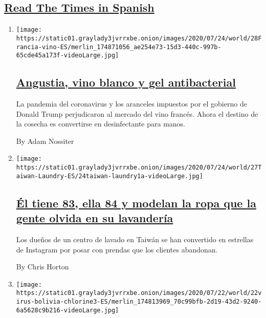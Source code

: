 \hypertarget{read-the-times-in-spanish}{%
\subsection{\texorpdfstring{\protect\hyperlink{}{Read The Times in
Spanish}}{Read The Times in Spanish}}\label{read-the-times-in-spanish}}

\begin{enumerate}
\def\labelenumi{\arabic{enumi}.}
\item
  \texttt{[image: https://static01.graylady3jvrrxbe.onion/images/2020/07/24/world/28Francia-vino-ES/merlin\_174871056\_ae254e73-15d3-440c-997b-65cde45a173f-videoLarge.jpg]}

  \hypertarget{angustia-vino-blanco-y-gel-antibacterial}{%
  \subsection{\texorpdfstring{\href{/es/2020/07/28/espanol/mundo/vino-blanco-alsacia-coronavirus.html}{Angustia,
  vino blanco y gel
  antibacterial}}{Angustia, vino blanco y gel antibacterial}}\label{angustia-vino-blanco-y-gel-antibacterial}}

  La pandemia del coronavirus y los aranceles impuestos por el gobierno
  de Donald Trump perjudicaron al mercado del vino francés. Ahora el
  destino de la cosecha es convertirse en desinfectante para manos.

  By Adam Nossiter
\item
  \texttt{[image: https://static01.graylady3jvrrxbe.onion/images/2020/07/24/world/27Taiwan-Laundry-ES/24taiwan-laundry1a-videoLarge.jpg]}

  \hypertarget{uxe9l-tiene-83-ella-84-y-modelan-la-ropa-que-la-gente-olvida-en-su-lavanderuxeda}{%
  \subsection{\texorpdfstring{\href{/es/2020/07/28/espanol/mundo/lavanderia-taiwanesa-instagram.html}{Él
  tiene 83, ella 84 y modelan la ropa que la gente olvida en su
  lavandería}}{Él tiene 83, ella 84 y modelan la ropa que la gente olvida en su lavandería}}\label{uxe9l-tiene-83-ella-84-y-modelan-la-ropa-que-la-gente-olvida-en-su-lavanderuxeda}}

  Los dueños de un centro de lavado en Taiwán se han convertido en
  estrellas de Instagram por posar con prendas que los clientes
  abandonan.

  By Chris Horton
\item
  \texttt{[image: https://static01.graylady3jvrrxbe.onion/images/2020/07/22/world/22virus-bolivia-chlorine3-ES/merlin\_174813969\_70c99bfb-2d19-43d2-9240-6a5628c9b216-videoLarge.jpg]}


\end{enumerate}
